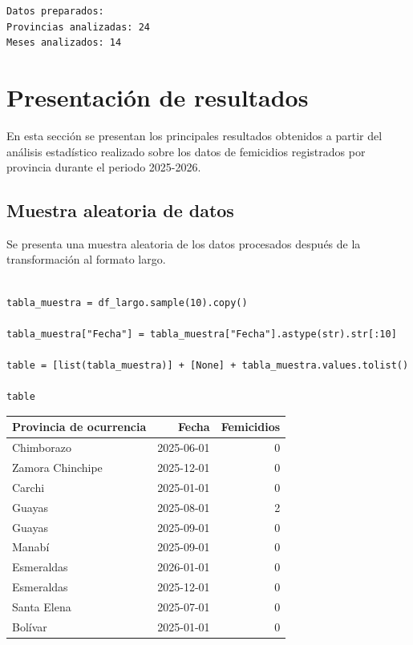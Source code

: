 \documentclass[11pt]{article}
\begin{document}
\begin{verbatim}
Datos preparados:
Provincias analizadas: 24
Meses analizados: 14
\end{verbatim}

\section{Presentación de resultados}
\label{sec:org3967973}

En esta sección se presentan los principales resultados obtenidos
a partir del análisis estadístico realizado sobre los datos de
femicidios registrados por provincia durante el periodo 2025-2026.


\subsection{Muestra aleatoria de datos}
\label{sec:orgc0ca81a}

Se presenta una muestra aleatoria de los datos procesados
después de la transformación al formato largo.

\begin{verbatim}

tabla_muestra = df_largo.sample(10).copy()

tabla_muestra["Fecha"] = tabla_muestra["Fecha"].astype(str).str[:10]

table = [list(tabla_muestra)] + [None] + tabla_muestra.values.tolist()

table

\end{verbatim}

\begin{center}
\begin{tabular}{lrr}
Provincia de ocurrencia & Fecha & Femicidios\\[0pt]
\hline
Chimborazo & 2025-06-01 & 0\\[0pt]
Zamora Chinchipe & 2025-12-01 & 0\\[0pt]
Carchi & 2025-01-01 & 0\\[0pt]
Guayas & 2025-08-01 & 2\\[0pt]
Guayas & 2025-09-01 & 0\\[0pt]
Manabí & 2025-09-01 & 0\\[0pt]
Esmeraldas & 2026-01-01 & 0\\[0pt]
Esmeraldas & 2025-12-01 & 0\\[0pt]
Santa Elena & 2025-07-01 & 0\\[0pt]
Bolívar & 2025-01-01 & 0\\[0pt]
\end{tabular}
\end{center}
\end{document}
